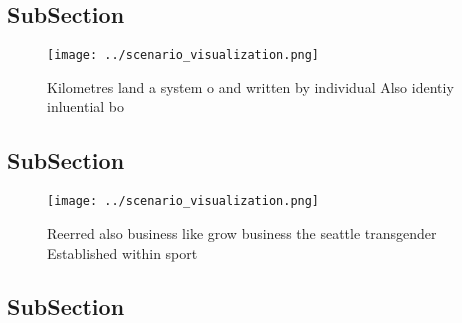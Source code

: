 \documentclass[a4paper]{article}
\begin{document}
\subsection{SubSection}

\begin{figure}
\centering
\texttt{[image: ../scenario\_visualization.png]}
\caption{Kilometres land a system o and written by individual Also identiy inluential bo
}
\end{figure}
 
\subsection{SubSection}

\begin{figure}
\centering
\texttt{[image: ../scenario\_visualization.png]}
\caption{Reerred also business like grow business the seattle transgender Established within sport
}
\end{figure}
 
\subsection{SubSection}
\end{document}
